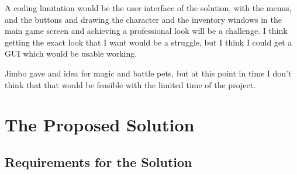 \documentclass[12pt]{article}
\begin{document}
A coding limitation would be the user interface of the solution, with the menus, and the buttons and drawing the character and the inventory windows in the main game screen and achieving a professional look will be a challenge. I think getting the exact look that I want would be a struggle, but I think I could get a GUI which would be usable working.

Jimbo gave and idea for magic and battle pets, but at this point in time I don’t think that that would be feasible with the limited time of the project.

	
	\section{The Proposed Solution}

		\subsection{Requirements for the Solution}
	
\end{document}
